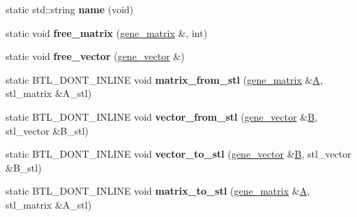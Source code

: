 \begin{DoxyCompactItemize}
\item 
\mbox{\label{classtensor__interface_a67ec853299d1e51e8de5792f29662d58}} 
static std\+::string {\bfseries name} (void)
\item 
\mbox{\label{classtensor__interface_acc4dd965c5eeba5461654fe375627b06}} 
static void {\bfseries free\+\_\+matrix} (\hyperlink{class_eigen_1_1_tensor}{gene\+\_\+matrix} \&, int)
\item 
\mbox{\label{classtensor__interface_a3b3eb0836a787c1efa320ad88d11a7f1}} 
static void {\bfseries free\+\_\+vector} (\hyperlink{class_eigen_1_1_tensor}{gene\+\_\+vector} \&)
\item 
\mbox{\label{classtensor__interface_ae8b9ffe5345b1a8bed0d7ad9e6aa6590}} 
static B\+T\+L\+\_\+\+D\+O\+N\+T\+\_\+\+I\+N\+L\+I\+NE void {\bfseries matrix\+\_\+from\+\_\+stl} (\hyperlink{class_eigen_1_1_tensor}{gene\+\_\+matrix} \&\hyperlink{group___core___module_class_eigen_1_1_matrix}{A}, stl\+\_\+matrix \&A\+\_\+stl)
\item 
\mbox{\label{classtensor__interface_a1c684ab8c12594170aa1ae75468cb9bc}} 
static B\+T\+L\+\_\+\+D\+O\+N\+T\+\_\+\+I\+N\+L\+I\+NE void {\bfseries vector\+\_\+from\+\_\+stl} (\hyperlink{class_eigen_1_1_tensor}{gene\+\_\+vector} \&\hyperlink{group___core___module_class_eigen_1_1_matrix}{B}, stl\+\_\+vector \&B\+\_\+stl)
\item 
\mbox{\label{classtensor__interface_a7a0253893f96e390d00e9e37c05ace13}} 
static B\+T\+L\+\_\+\+D\+O\+N\+T\+\_\+\+I\+N\+L\+I\+NE void {\bfseries vector\+\_\+to\+\_\+stl} (\hyperlink{class_eigen_1_1_tensor}{gene\+\_\+vector} \&\hyperlink{group___core___module_class_eigen_1_1_matrix}{B}, stl\+\_\+vector \&B\+\_\+stl)
\item 
\mbox{\label{classtensor__interface_a70c7fd98c15c2157ea7ff6aefee99ca5}} 
static B\+T\+L\+\_\+\+D\+O\+N\+T\+\_\+\+I\+N\+L\+I\+NE void {\bfseries matrix\+\_\+to\+\_\+stl} (\hyperlink{class_eigen_1_1_tensor}{gene\+\_\+matrix} \&\hyperlink{group___core___module_class_eigen_1_1_matrix}{A}, stl\+\_\+matrix \&A\+\_\+stl)
\item 

\end{DoxyCompactItemize}
